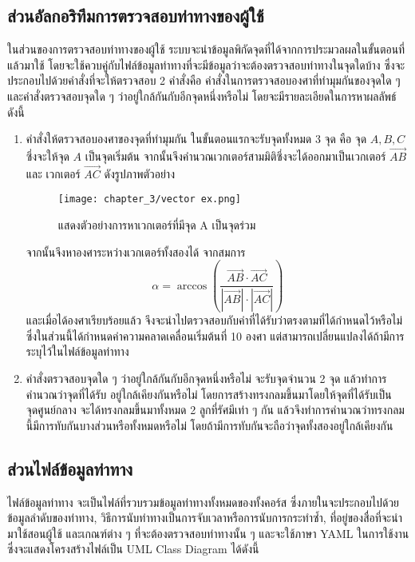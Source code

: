 \subsection{ส่วนอัลกอริทึมการตรวจสอบท่าทางของผู้ใช้}
ในส่วนของการตรวจสอบท่าทางของผู้ใช้ ระบบจะนำข้อมูลพิกัดจุดที่ได้จากการประมวลผลในขั้นตอนที่แล้วมาใช้ โดยจะใช้ควบคู่กับไฟล์ข้อมูลท่าทางที่จะมีข้อมูลว่าจะต้องตรวจสอบท่าทางในจุดใดบ้าง ซึ่งจะประกอบไปด้วยคำสั่งที่จะให้ตรวจสอบ 2 คำสั่งคือ คำสั่งในการตรวจสอบองศาที่ทำมุมกันของจุดใด ๆ และคำสั่งตรวจสอบจุดใด ๆ ว่าอยู่ใกล้กันกับอีกจุดหนึ่งหรือไม่ โดยจะมีรายละเอียดในการหาผลลัพธ์ ดังนี้
\begin{enumerate}
    \item 	คำสั่งให้ตรวจสอบองศาของจุดที่ทำมุมกัน ในขั้นตอนแรกจะรับจุดทั้งหมด 3 จุด คือ จุด $A,B,C$ ซึ่งจะให้จุด $A$ เป็นจุดเริ่มต้น จากนั้นจึงคำนวณเวกเตอร์สามมิติซึ่งจะได้ออกมาเป็นเวกเตอร์ $\overrightarrow{AB}$ และ เวกเตอร์ $\overrightarrow{AC}$ ดังรูปภาพตัวอย่าง
    \begin{figure}
        \texttt{[image: chapter\_3/vector ex.png]}
        \caption{แสดงตัวอย่างการหาเวกเตอร์ที่มีจุด A เป็นจุดร่วม}
    \end{figure}
    จากนั้นจึงหาองศาระหว่างเวกเตอร์ทั้งสองได้ จากสมการ
    \begin{equation}
        \alpha = \arccos{\left( \frac{\overrightarrow{AB} \cdot \overrightarrow{AC}}{|\overrightarrow{AB}| \cdot |\overrightarrow{AC}|} \right)}
    \end{equation}
    และเมื่อได้องศาเรียบร้อยแล้ว จึงจะนำไปตรวจสอบกับค่าที่ได้รับว่าตรงตามที่ได้กำหนดไว้หรือไม่ ซึ่งในส่วนนี้ได้กำหนดค่าความคลาดเคลื่อนเริ่มต้นที่ 10 องศา แต่สามารถเปลี่ยนแปลงได้ถ้ามีการระบุไว้ในไฟล์ข้อมูลท่าทาง
    \item คำสั่งตรวจสอบจุดใด ๆ ว่าอยู่ใกล้กันกับอีกจุดหนึ่งหรือไม่ จะรับจุดจำนวน 2 จุด แล้วทำการคำนวณว่าจุดที่ได้รับ อยู่ใกล้เคียงกันหรือไม่ โดยการสร้างทรงกลมขึ้นมาโดยให้จุดที่ได้รับเป็นจุดศูนย์กลาง จะได้ทรงกลมขึ้นมาทั้งหมด 2 ลูกที่รัศมีเท่า ๆ กัน แล้วจึงทำการคำนวณว่าทรงกลมนี้มีการทับกันบางส่วนหรือทั้งหมดหรือไม่ โดยถ้ามีการทับกันจะถือว่าจุดทั้งสองอยู่ใกล้เคียงกัน
\end{enumerate}

\subsection{ส่วนไฟล์ข้อมูลท่าทาง}
ไฟล์ข้อมูลท่าทาง จะเป็นไฟล์ที่รวบรวมข้อมูลท่าทางทั้งหมดของทั้งคอร์ส ซึ่งภายในจะประกอบไปด้วยข้อมูลลำดับของท่าทาง, วิธีการนับท่าทางเป็นการจับเวลาหรือการนับการกระทำซ้ำ, ที่อยู่ของสื่อที่จะนำมาใช้สอนผู้ใช้ และเกณฑ์ต่าง ๆ ที่จะต้องตรวจสอบท่าทางนั้น ๆ และจะใช้ภาษา YAML ในการใช้งาน ซึ่งจะแสดงโครงสร้างไฟล์เป็น UML Class Diagram ได้ดังนี้

